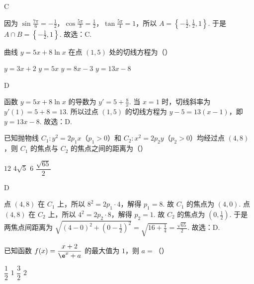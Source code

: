 \begin{answer}
C
\end{answer}

\begin{solution}
因为 \(\sin \frac{7\pi}{6}=-\frac{1}{2}\)，\(\cos \frac{5\pi}{3}=\frac{1}{2}\)，\(\tan \frac{5\pi}{4}=1\)，所以 \(A=\left\{ -\frac{1}{2},\frac{1}{2},1 \right\}\). 于是 \(A\cap B=\left\{ -\frac{1}{2},1 \right\}\). 故选：C.
\end{solution}

\begin{problem}
曲线 \(y=5x+8\ln x\) 在点 \((1,5)\) 处的切线方程为（\quad）

\choices
    {\(y=3x+2\)}
    {\(y=5x\)}
    {\(y=8x-3\)}
    {\(y=13x-8\)}
\end{problem}

\begin{answer}
D
\end{answer}

\begin{solution}
函数 \(y=5x+8\ln x\) 的导数为 \(y'=5+\frac{8}{x}\). 当 \(x=1\) 时，切线斜率为 \(y'(1)=5+8=13\). 所以过点 \((1,5)\) 的切线方程为 \(y-5=13\left( x-1 \right)\)，即 \(y=13x-8\). 故选：D.
\end{solution}

\begin{problem}
已知抛物线 \(C_1:y^2=2p_1x\)（\(p_1>0\)）和 \(C_2:x^2=2p_2y\)（\(p_2>0\)）均经过点 \((4,8)\)，则 \(C_1\) 的焦点与 \(C_2\) 的焦点之间的距离为（\quad）

\choices
    {\(12\)}
    {\(4\sqrt{5}\)}
    {\(6\)}
    {\(\dfrac{\sqrt{65}}{2}\)}
\end{problem}

\begin{answer}
D
\end{answer}

\begin{solution}
点 \((4,8)\) 在 \(C_1\) 上，所以 \(8^2=2p_1\cdot 4\)，解得 \(p_1=8\). 故 \(C_1\) 的焦点为 \(\left( 4,0 \right)\).
点 \((4,8)\) 在 \(C_2\) 上，所以 \(4^2=2p_2\cdot 8\)，解得 \(p_2=1\). 故 \(C_2\) 的焦点为 \(\left( 0,\frac{1}{2} \right)\).
于是两焦点间距离为 \(\sqrt{\left( 4-0 \right)^2+\left( 0-\frac{1}{2} \right)^2}=\sqrt{16+\frac{1}{4}}=\frac{\sqrt{65}}{2}\). 故选：D.
\end{solution}

\begin{problem}
已知函数 \(f(x)=\dfrac{x+2}{\e^x+a}\) 的最大值为 \(1\)，则 \(a=\)（\quad）

\choices
    {\(\dfrac{1}{2}\)}
    {\(1\)}
    {\(\dfrac{3}{2}\)}
    {\(2\)}
\end{problem}

